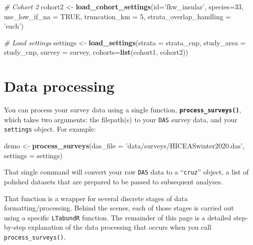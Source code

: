\documentclass[
]{book}
\newenvironment{Shaded}{\begin{snugshade}}{\end{snugshade}}
\newcommand{\CommentTok}[1]{\textcolor[rgb]{0.56,0.35,0.01}{\textit{#1}}}
\newcommand{\DataTypeTok}[1]{\textcolor[rgb]{0.13,0.29,0.53}{#1}}
\newcommand{\DecValTok}[1]{\textcolor[rgb]{0.00,0.00,0.81}{#1}}
\newcommand{\KeywordTok}[1]{\textcolor[rgb]{0.13,0.29,0.53}{\textbf{#1}}}
\newcommand{\NormalTok}[1]{#1}
\newcommand{\OtherTok}[1]{\textcolor[rgb]{0.56,0.35,0.01}{#1}}
\newcommand{\StringTok}[1]{\textcolor[rgb]{0.31,0.60,0.02}{#1}}
\begin{document}
\begin{Shaded}
\begin{Highlighting}[]
\CommentTok{# Cohort 2}
\NormalTok{cohort2 <-}\StringTok{ }
\StringTok{  }\KeywordTok{load_cohort_settings}\NormalTok{(}\DataTypeTok{id=}\StringTok{'fkw_insular'}\NormalTok{,}
                       \DataTypeTok{species=}\DecValTok{33}\NormalTok{,}
                       \DataTypeTok{use_low_if_na =} \OtherTok{TRUE}\NormalTok{,}
                       \DataTypeTok{truncation_km =} \DecValTok{5}\NormalTok{,}
                       \DataTypeTok{strata_overlap_handling =} \StringTok{'each'}\NormalTok{)}

\CommentTok{# Load settings}
\NormalTok{settings <-}\StringTok{ }\KeywordTok{load_settings}\NormalTok{(}\DataTypeTok{strata =}\NormalTok{ strata_cnp,}
                          \DataTypeTok{study_area =}\NormalTok{ study_cnp,}
                          \DataTypeTok{survey =}\NormalTok{ survey,}
                          \DataTypeTok{cohorts=}\KeywordTok{list}\NormalTok{(cohort1,}
\NormalTok{                                       cohort2))}
\end{Highlighting}
\end{Shaded}

\hypertarget{processing}{%
\chapter{Data processing}\label{processing}}

You can process your survey data using a single function, \textbf{\texttt{process\_surveys()}}, which takes two arguments: the filepath(s) to your \texttt{DAS} survey data, and your \texttt{settings} object. For example:

\begin{Shaded}
\begin{Highlighting}[]
\NormalTok{demo <-}\StringTok{ }\KeywordTok{process_surveys}\NormalTok{(}\DataTypeTok{das_file =} \StringTok{'data/surveys/HICEASwinter2020.das'}\NormalTok{,}
                \DataTypeTok{settings =}\NormalTok{ settings)}
\end{Highlighting}
\end{Shaded}

That single command will convert your raw \texttt{DAS} data to a ``\texttt{cruz}'' object, a list of polished datasets that are prepared to be passed to subsequent analyses.

That function is a wrapper for several discrete stages of data formatting/processing. Behind the scenes, each of those stages is carried out using a specific \texttt{LTabundR} function. The remainder of this page is a detailed step-by-step explanation of the data processing that occurs when you call \texttt{process\_surveys()}.
\end{document}

